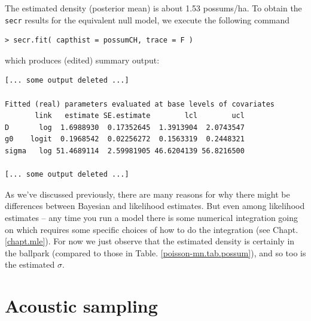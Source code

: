The estimated density (posterior mean) is about 1.53 possums/ha.  To
obtain the \mbox{\tt secr} results for the equivalent null model, we
execute the following command
\begin{verbatim}
> secr.fit( capthist = possumCH, trace = F )
\end{verbatim}
which produces (edited) summary output:
\begin{verbatim}
[... some output deleted ...]

Fitted (real) parameters evaluated at base levels of covariates
       link   estimate SE.estimate        lcl        ucl
D       log  1.6988930  0.17352645  1.3913904  2.0743547
g0    logit  0.1968542  0.02256272  0.1563319  0.2448321
sigma   log 51.4689114  2.59981905 46.6204139 56.8216500

[... some output deleted ...]
\end{verbatim}
As we've discussed previously, there are many reasons for why there
might be differences between Bayesian and likelihood estimates.  But
even among likelihood estimates -- any time you run a model there is
some numerical integration going on which requires some specific
choices of how to do the integration (see Chapt. \ref{chapt.mle}).
For now we just observe that the estimated density is certainly in the
ballpark (compared to those in Table. \ref{poisson-mn.tab.possum}), and so too is the estimated $\sigma$.



\section{Acoustic sampling}
\label{poisson-mn.sec.acoustic}

